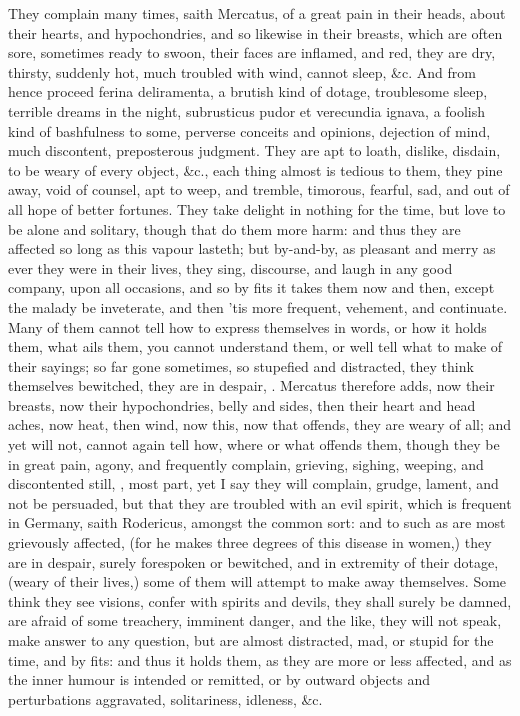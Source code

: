 {They complain many times, saith Mercatus, of a great pain in their
heads, about their hearts, and hypochondries, and so likewise in their
breasts, which are often sore, sometimes ready to swoon, their faces
are inflamed, and red, they are dry, thirsty, suddenly hot, much
troubled with wind, cannot sleep, \&c. And from hence proceed ferina
deliramenta, a brutish kind of dotage, troublesome sleep, terrible
dreams in the night, subrusticus pudor et verecundia ignava, a foolish
kind of bashfulness to some, perverse conceits and opinions,
dejection of mind, much discontent, preposterous judgment. They
are apt to loath, dislike, disdain, to be weary of every object, \&c.,
each thing almost is tedious to them, they pine away, void of counsel,
apt to weep, and tremble, timorous, fearful, sad, and out of all hope
of better fortunes. They take delight in nothing for the time, but love
to be alone and solitary, though that do them more harm: and thus they
are affected so long as this vapour lasteth; but by-and-by, as pleasant
and merry as ever they were in their lives, they sing, discourse, and
laugh in any good company, upon all occasions, and so by fits it takes
them now and then, except the malady be inveterate, and then 'tis more
frequent, vehement, and continuate. Many of them cannot tell how to
express themselves in words, or how it holds them, what ails them, you
cannot understand them, or well tell what to make of their sayings; so
far gone sometimes, so stupefied and distracted, they think themselves
bewitched, they are in despair, . Mercatus therefore adds, now their breasts, now
their hypochondries, belly and sides, then their heart and head aches,
now heat, then wind, now this, now that offends, they are weary of all;
and yet will not, cannot again tell how, where or what offends
them, though they be in great pain, agony, and frequently complain,
grieving, sighing, weeping, and discontented still, , most part, yet I say they will complain, grudge, lament, and
not be persuaded, but that they are troubled with an evil spirit, which
is frequent in Germany, saith Rodericus, amongst the common sort: and
to such as are most grievously affected, (for he makes three degrees of
this disease in women,) they are in despair, surely forespoken or
bewitched, and in extremity of their dotage, (weary of their lives,)
some of them will attempt to make away themselves. Some think they see
visions, confer with spirits and devils, they shall surely be damned,
are afraid of some treachery, imminent danger, and the like, they will
not speak, make answer to any question, but are almost distracted, mad,
or stupid for the time, and by fits: and thus it holds them, as they
are more or less affected, and as the inner humour is intended or
remitted, or by outward objects and perturbations aggravated,
solitariness, idleness, \&c.

}
